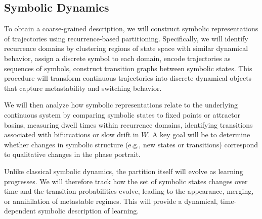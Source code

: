 \documentclass{article}
\begin{document}
\subsection*{Symbolic Dynamics}
To obtain a coarse-grained description, we will construct symbolic representations of trajectories using recurrence-based partitioning. Specifically, we will identify recurrence domains by clustering regions of state space with similar dynamical behavior, assign a discrete symbol to each domain, encode trajectories as sequences of symbols, construct transition graphs between symbolic states. This procedure will transform continuous trajectories into discrete dynamical objects that capture metastability and switching behavior.

We will then analyze how symbolic representations relate to the underlying continuous system by comparing symbolic states to fixed points or attractor basins, measuring dwell times within recurrence domains, identifying transitions associated with bifurcations or slow drift in $W$. A key goal will be to determine whether changes in symbolic structure (e.g., new states or transitions) correspond to qualitative changes in the phase portrait.

Unlike classical symbolic dynamics, the partition itself will evolve as learning progresses. We will therefore track how the set of symbolic states changes over time and the transition probabilities evolve, leading to the appearance, merging, or annihilation of metastable regimes. This will provide a dynamical, time-dependent symbolic description of learning.

\end{document}
